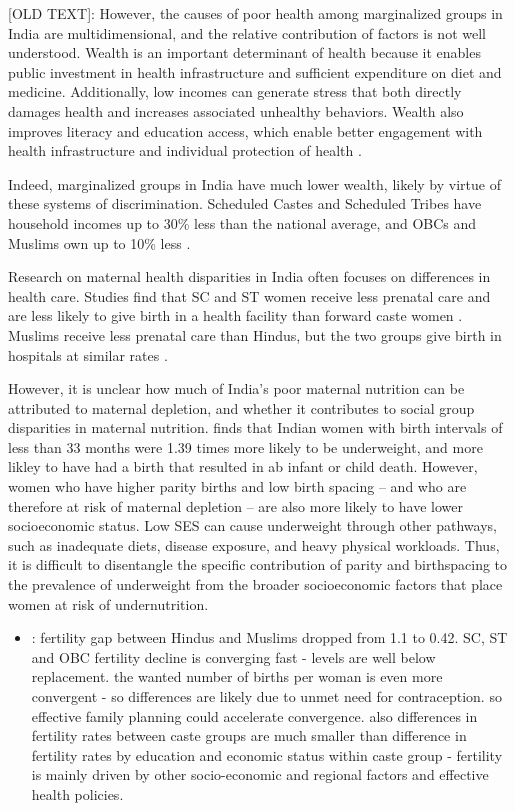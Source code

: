 [OLD TEXT]:
However, the causes of poor health among marginalized groups in India are multidimensional, and the relative contribution of factors is not well understood. Wealth is an important determinant of health because it enables public investment in health infrastructure and sufficient expenditure on diet and medicine. Additionally, low incomes can generate stress that both directly damages health and increases associated unhealthy behaviors. Wealth also improves literacy and education access, which enable better engagement with health infrastructure and individual protection of health \citep{rajan2013wealthier}. 

Indeed, marginalized groups in India have much lower wealth, likely by virtue of these systems of discrimination. Scheduled Castes and Scheduled Tribes have household incomes up to 30\% less than the national average, and OBCs and Muslims own up to 10\% less \citep{bharti2018wealth}.




Research on maternal health disparities in India often focuses on differences in health care.  Studies find that SC and ST women receive less prenatal care and are less likely to give birth in a health facility than forward caste women \citep{dommaraju2008pervasive, kumar2016explaining, das2022caste}.  Muslims receive less prenatal care than Hindus, but the two groups give birth in hospitals at similar rates \citep{bango2024pattern, ohlan2020muslim}.

However, it is unclear how much of India's poor maternal nutrition can be attributed to maternal depletion, and whether it contributes to social group disparities in maternal nutrition. \cite{kundu2025short} finds that Indian women with birth intervals of less than 33 months were 1.39 times more likely to be underweight, and more likley to have had a birth that resulted in ab infant or child death. However, women who have higher parity births and low birth spacing -- and who are therefore at risk of maternal depletion -- are also more likely to have lower socioeconomic status.  Low SES can cause underweight through other pathways, such as inadequate diets, disease exposure, and heavy physical workloads. Thus, it is difficult to disentangle the specific contribution of parity and birthspacing to the prevalence of underweight from the broader socioeconomic factors that place women at risk of undernutrition.


\begin{itemize}
    \item \cite{srinivas2024rapid}: fertility gap between Hindus and Muslims dropped from 1.1 to 0.42. SC, ST and OBC fertility decline is converging fast  - levels are well below replacement. the wanted number of births per woman is even more convergent - so differences are likely due to unmet need for contraception. so effective family planning could accelerate convergence. also differences in fertility rates between caste groups are much smaller than difference in fertility rates by education and economic status within caste group - fertility is mainly driven by other socio-economic and regional factors and effective health policies.
\end{itemize}

